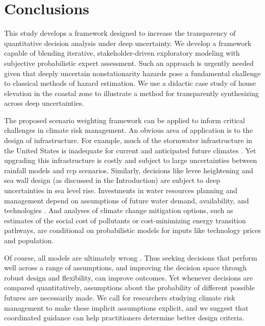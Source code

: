 \documentclass{agujournal2019}
\begin{document}
\section{Conclusions}\label{sec:conclusions}

This study develops a framework designed to increase the transparency of quantitative decision analysis under deep uncertainty.
We develop a framework capable of blending iterative, stakeholder-driven exploratory modeling with subjective probabilistic expert assessment. %
Such an approach is urgently needed given that deeply uncertain nonstationarity hazards pose a fundamental challenge to classical methods of hazard estimation.
We use a didactic case study of house elevation in the coastal zone to illustrate a method for transparently synthesizing across deep uncertainties.

The proposed scenario weighting framework can be applied to inform critical challenges in climate risk management.
An obvious area of application is to the design of infrastructure.
For example, much of the stormwater infrastructure in the United States is inadequate for current and anticipated future climates \cite{lopez-cantu:2018}.
Yet upgrading this infrastructure is costly and subject to large uncertainties between rainfall models \cite{sharma_rcp:2021} and \gls{rcp} scenarios.
Similarly, decisions like  levee heightening \cite{garner_slrise:2018,oddo_coastal:2017,vandantzig_dike:1956} and sea wall design (as discussed in the Introduction) are subject to deep uncertainties in sea level rise.
Investments in water resources planning and management depend on assumptions of future water demand, availability, and technologies \cite{trindade_deeplyuncertainpathways:2019}.
And analyses of climate change mitigation options, such as estimates of the social cost of pollutants \cite{errickson_methane:2021} or cost-minimizing energy transition pathways, are conditional on probabilistic models for inputs like technology prices and population.

Of course, all models are ultimately wrong \cite{box_sciencestatistics:1976}.
Thus seeking decisions that perform well across a range of assumptions, and improving the decision space through robust design and flexibility, can improve outcomes.
Yet whenever decisions are compared quantitatively, assumptions about the probability of different possible futures are necessarily made.
We call for researchers studying climate risk management to make these implicit assumptions explicit, and we suggest that coordinated guidance can help practitioners determine better design criteria.
\end{document}
